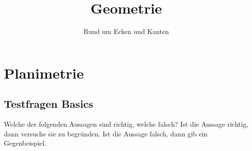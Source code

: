 \documentclass[%
11pt,%
twoside,%
titlepage,%
german,%
headsepline%
]{scrartcl}
\title{Geometrie}
\subtitle{Rund um Ecken und Kanten}
\author{}
\date{}
\begin{document}
\maketitle
\tableofcontents
\cleardoublepage

\section{Planimetrie}

\subsection{Testfragen Basics}
Welche der folgenden Aussagen sind richtig, welche falsch? Ist die Aussage richtig, dann versuche sie zu begr\"unden. Ist die Aussage falsch, dann gib ein Gegenbeispiel.
\end{document}
